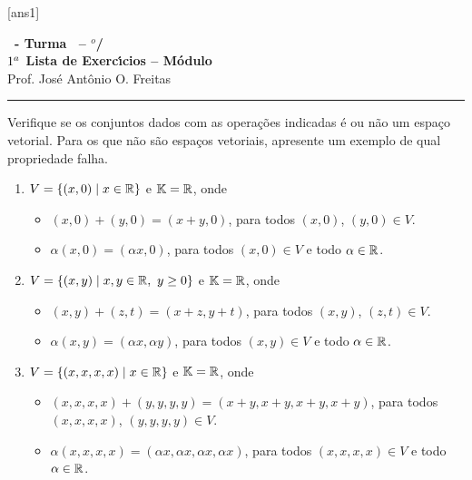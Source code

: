 \documentclass[12pt]{exam}
\begin{document}
  [ans1]
  \begin{center}
    {\Large\bf \disciplina\ - Turma \turma\ -- \semestre$^{o}$/\ano} \\ \vspace{9pt} {\large\bf
        $1^a$ Lista de Exerc{\'\i}cios -- Módulo \numeromodulo}\\ \vspace{9pt} Prof. Jos{\'e} Ant{\^o}nio O. Freitas
  \end{center}
  \hrule


\begin{exercicio}
  Verifique se os conjuntos dados com as operações indicadas é ou não um espaço vetorial. Para os que não são espaços vetoriais, apresente um exemplo de qual propriedade falha.
  \begin{enumerate}[label={\alph*)}]
    \item $V = \{(x, 0) \mid x \in \mathbb{R}\}$ e $\mathbb{K} = \mathbb{R}$, onde
      \begin{itemize}
        \item $(x, 0) + (y, 0) = (x + y, 0)$, para todos $(x, 0)$, $(y, 0) \in V$.
        \item $\alpha(x, 0) = (\alpha x, 0)$, para todos $(x, 0) \in V$ e todo $\alpha \in \mathbb{R}$.
      \end{itemize}

    \item $V = \{(x, y) \mid x, y \in \mathbb{R},\ y \ge 0\}$ e $\mathbb{K} = \mathbb{R}$, onde
      \begin{itemize}
        \item $(x, y) + (z, t) = (x + z, y + t)$, para todos $(x, y)$, $(z, t) \in V$.
        \item $\alpha(x, y) = (\alpha x, \alpha y)$, para todos $(x, y) \in V$ e todo $\alpha \in \mathbb{R}$.
      \end{itemize}
  
    \item $V = \{(x, x, x, x) \mid x \in \mathbb{R}\}$ e $\mathbb{K} = \mathbb{R}$, onde
      \begin{itemize}
        \item $(x, x, x, x) + (y, y, y, y) = (x + y, x + y, x + y, x + y)$, para todos $(x, x, x, x)$, $(y, y, y, y) \in V$.
        \item $\alpha(x, x, x, x) = (\alpha x, \alpha x, \alpha x, \alpha x)$, para todos $(x, x, x, x) \in V$ e todo $\alpha \in \mathbb{R}$.
      \end{itemize}
 

\end{enumerate}
\end{exercicio}
\end{document}
